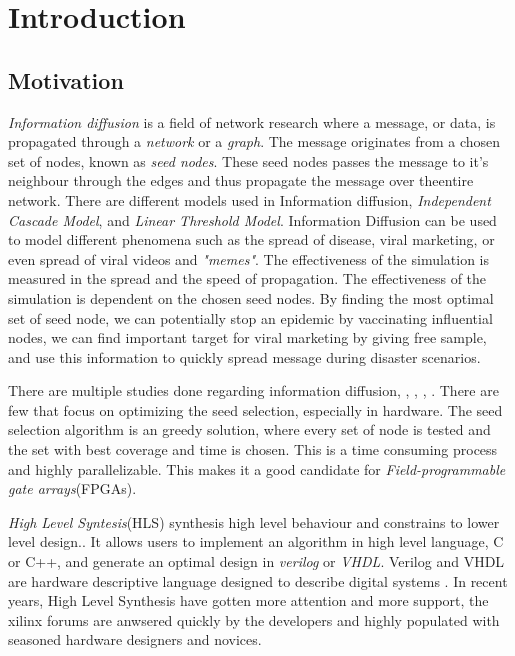 \chapter{Introduction} \label{intro}

\section{Motivation}
\textit{Information diffusion} is a field of network research where a message, or data, is propagated through a \textit{network} or a \textit{graph}. The message originates from a chosen set of nodes, known as \textit{seed nodes}. These seed nodes passes the message to it's neighbour through the edges and thus propagate the message over theentire network. There are different models used in Information diffusion, \textit{Independent Cascade Model}, and \textit{Linear Threshold Model}. Information Diffusion can be used to model different phenomena such as the spread of disease, viral marketing, or even spread of viral videos and \textit{"memes"}\cite{InformationDiffusionThroughBlogspace}. The effectiveness of the simulation is measured in the spread and the speed of propagation. The effectiveness of the simulation is dependent on the chosen seed nodes. By finding the most optimal set of seed node, we can potentially stop an epidemic by vaccinating influential nodes, we can find important target for viral marketing by giving free sample, and use this information to quickly spread message during disaster scenarios.

There are multiple studies done regarding information diffusion, \cite{cha2010measuring}, \cite{InformationDiffusionThroughBlogspace}, \cite{5694014},  \cite{InfoDiffAndExternalInfluInNetworks}. There are few that focus on optimizing the seed selection, especially in hardware. The seed selection algorithm is an greedy solution, where every set of node is tested and the set with best coverage and time is chosen. This is a time consuming process and highly parallelizable. This makes it a good candidate for \textit{Field-programmable gate arrays}(FPGAs). 

\textit{High Level Syntesis}(HLS) synthesis high level behaviour and constrains to lower level design.\cite{52214}. It allows users to implement an algorithm in high level language, C or C++, and generate an optimal design in \textit{verilog} or \textit{VHDL}. Verilog and VHDL are hardware descriptive language designed to describe digital systems \cite{thomas2008verilog}. In recent years, High Level Synthesis have gotten more attention and more support, the xilinx forums are anwsered quickly by the developers and highly populated with seasoned hardware designers and novices. 

